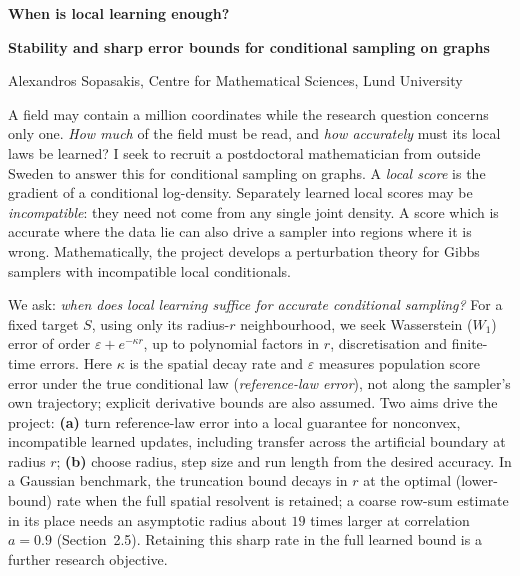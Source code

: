 \documentclass[12pt,a4paper]{article}
\newcommand{\W}{W_1}
\begin{document}
{\LARGE\bfseries When is local learning enough?\par}
\vspace{3pt}
{\large\bfseries Stability and sharp error bounds for conditional sampling on graphs\par}
\vspace{4pt}
Alexandros Sopasakis, Centre for Mathematical Sciences, Lund University

A field may contain a million coordinates while the research question concerns only one. \textit{How much} of the field must be read, and \textit{how accurately} must its local laws be learned? I seek to recruit a postdoctoral mathematician from outside Sweden to answer this for conditional sampling on graphs. A \emph{local score} is the gradient of a conditional log-density. Separately learned local scores may be \emph{incompatible}: they need not come from any single joint density. A score which is accurate where the data lie can also drive a sampler into regions where it is wrong. Mathematically, the project develops a perturbation theory for Gibbs samplers with incompatible local conditionals.

We ask: \emph{when does local learning suffice for accurate conditional sampling?} For a fixed target $S$, using only its radius-$r$ neighbourhood, we seek Wasserstein ($\W$) error of order $\varepsilon+e^{-\kappa r}$, up to polynomial factors in $r$, discretisation and finite-time errors. Here $\kappa$ is the spatial decay rate and $\varepsilon$ measures population score error under the true conditional law (\emph{reference-law error}), not along the sampler's own trajectory; explicit derivative bounds are also assumed. Two aims drive the project: \textbf{(a)} turn reference-law error into a local guarantee for nonconvex, incompatible learned updates, including transfer across the artificial boundary at radius $r$; \textbf{(b)} choose radius, step size and run length from the desired accuracy. In a Gaussian benchmark, the truncation bound decays in $r$ at the optimal (lower-bound) rate when the full spatial resolvent is retained; a coarse row-sum estimate in its place needs an asymptotic radius about $19$ times larger at correlation $a=0.9$ (Section~2.5). Retaining this sharp rate in the full learned bound is a further research objective.
\end{document}
